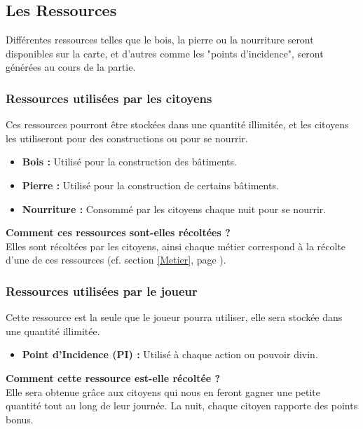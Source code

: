 \documentclass[a4paper]{memoir}
\begin{document}
				
			\subsection{Les Ressources}
				Différentes ressources telles que le bois, la pierre ou la nourriture seront disponibles sur la carte, et d'autres comme les "points d'incidence", seront générées au cours de la partie.
				
				\subsubsection{Ressources utilisées par les citoyens}
					Ces ressources pourront être stockées dans une quantité illimitée, et les citoyens les utiliseront pour des constructions ou pour se nourrir.
					\begin{itemize}[label=$\bullet$]
						\item \textbf{Bois :} Utilisé pour la construction des bâtiments.
						\item \textbf{Pierre :} Utilisé pour la construction de certains bâtiments.
						\item \textbf{Nourriture :} Consommé par les citoyens chaque nuit pour se nourrir.
					\end{itemize}
					\textbf{Comment ces ressources sont-elles récoltées ? }\\
					Elles sont récoltées par les citoyens, ainsi chaque métier correspond à la récolte d'une de ces ressources (cf. section \ref{Metier}, page \pageref{Metier}).

				\subsubsection{Ressources utilisées par le joueur}
					Cette ressource est la seule que le joueur pourra utiliser, elle sera stockée dans une quantité illimitée.
					\begin{itemize}[label=$\bullet$]
						\item \textbf{Point d'Incidence (PI) :} Utilisé à chaque action ou pouvoir divin.
					\end{itemize}
					\textbf{Comment cette ressource est-elle récoltée ? }\\
					Elle sera obtenue grâce aux citoyens qui nous en feront gagner une petite quantité tout au long de leur journée. La nuit, chaque citoyen rapporte des points bonus.
\end{document}
